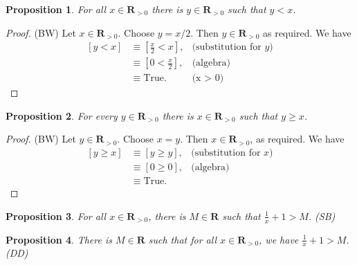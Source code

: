 \documentclass[12pt,fleqn]{article}
\newcommand{\reals}{\mathbf{R}}
\newcommand{\true}{\mathrm{True}}
\newenvironment{myproof}
  {\begin{shaded}\begin{proof}}
  {\end{proof}\end{shaded}}
\newtheorem{prop}{Proposition}
\begin{document}
    \begin{prop}   For all $x \in \reals_{>0}$ there is 
      $y \in \reals_{> 0}$ such that $y < x$. 
    \end{prop}
     
    
      
      \begin{myproof} (BW) Let $x \in \reals_{>0}$. Choose $y = x/2$. Then $y \in \reals_{>0}$ as required. We have
         \begin{align*}
         \left[y < x \right] &\equiv \left[\frac{x}{2} < x \right], &\mbox{(substitution for $y$)} \\
                                   &\equiv \left[0 < \frac{x}{2}  \right], &\mbox{(algebra)} \\
                                   &\equiv \true.  &\mbox{(x > 0)}
      \end{align*}
      \end{myproof}

       

       \begin{prop} For every $y \in \reals_{> 0}$ there is  
        $x \in \reals_{>0}$ such that $y \geq  x$.
      \end{prop}

       \begin{myproof} (BW) Let $y \in \reals_{>0}$. Choose $x = y$. Then $x \in \reals_{>0}$, as 
        required. We have
       \begin{align*}
         \left[y \geq x  \right] &\equiv \left[y \geq  y \right], & \mbox{(substitution for $x$)} \\
                                      &\equiv \left[0 \geq 0 \right], &\mbox{(algebra)} \\
                                      &\equiv \true.
       \end{align*}
       
       \end{myproof}

   


       
    \begin{prop} For all $x \in \reals_{>0}$, there is $M \in \reals$ such
     that $\frac{1}{x} +1 > M$. \hfill (SB)
    \end{prop}

    \begin{prop}
      There is $M \in \reals$ such that for all $x \in \reals_{>0}$,
     we have $\frac{1}{x} + 1 > M$. \hfill (DD) 
    \end{prop}
\end{document}
